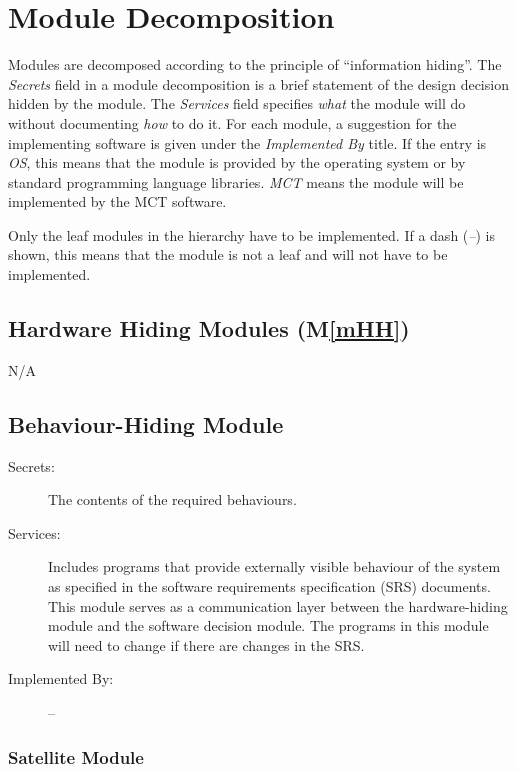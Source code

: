 \documentclass[12pt, titlepage]{article}
\newcommand{\mref}[1]{M\ref{#1}}
\begin{document}
\section{Module Decomposition} \label{SecMD}

Modules are decomposed according to the principle of ``information hiding''. The \emph{Secrets} field in a module
decomposition is a brief statement of the design decision hidden by the
module. The \emph{Services} field specifies \emph{what} the module will do
without documenting \emph{how} to do it. For each module, a suggestion for the
implementing software is given under the \emph{Implemented By} title. If the
entry is \emph{OS}, this means that the module is provided by the operating
system or by standard programming language libraries.  \emph{MCT} means the
module will be implemented by the MCT software.

Only the leaf modules in the hierarchy have to be implemented. If a dash
(\emph{--}) is shown, this means that the module is not a leaf and will not have
to be implemented.

\subsection{Hardware Hiding Modules (\mref{mHH})}

\begin{description}
\item N/A
\end{description}

\subsection{Behaviour-Hiding Module}


 
\begin{description}
\item[Secrets:]The contents of the required behaviours.
\item[Services:]Includes programs that provide externally visible behaviour of
  the system as specified in the software requirements specification (SRS)
  documents. This module serves as a communication layer between the
  hardware-hiding module and the software decision module. The programs in this
  module will need to change if there are changes in the SRS.
\item[Implemented By:] --
\end{description}

\subsubsection{Satellite Module}
\end{document}
